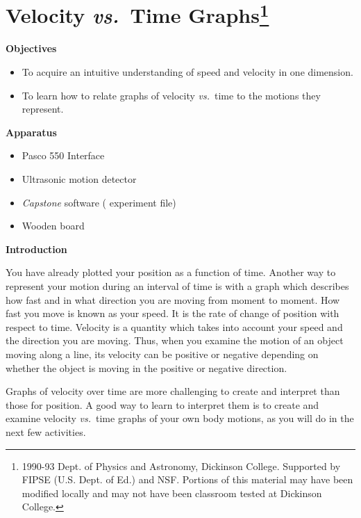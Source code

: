 
\section{Velocity \textit{vs.}~Time Graphs\footnote{
1990-93 Dept. of Physics and Astronomy, Dickinson College. Supported by FIPSE
(U.S. Dept. of Ed.) and NSF. Portions of this material may have been modified
locally and may not have been classroom tested at Dickinson College.
}}

\makelabheader %

\bigskip

\textbf{Objectives }

\begin{itemize}[nosep]
\item To acquire an intuitive understanding of speed and velocity in one dimension. 
\item To learn how to relate graphs of velocity \textit{vs.}~time to the motions they represent.
\end{itemize}

\bigskip
\textbf{Apparatus}

\begin{itemize}[nosep]
\item Pasco 550 Interface
\item Ultrasonic motion detector
\item \textit{Capstone} software ( experiment file)
\item Wooden board
\end{itemize}

\bigskip
\textbf{Introduction} 

You have already plotted your position as a function of time. Another way to
represent your motion during an interval of time is with a graph which describes
how fast and in what direction you are moving from moment to moment. How fast
you move is known as your speed. It is the rate of change of position with respect
to time. Velocity is a quantity which takes into account your speed and the
direction you are moving. Thus, when you examine the motion of an object moving
along a line, its velocity can be positive or negative depending
on whether the object is moving in the positive or negative direction.

Graphs of velocity over time are more challenging to create and interpret than
those for position. A good way to learn to interpret them is to create and examine velocity \textit{vs.}~time graphs of your own body motions, as you will do in the next few activities.

